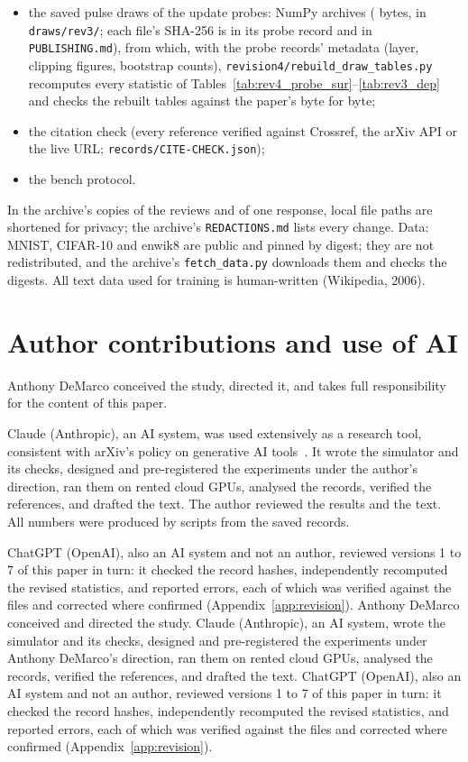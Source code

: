\begin{sloppypar}
\begin{itemize}
      \texttt{revision2/analyze\_rev2.py}, \texttt{revision3/analyze\_rev3.py}, \texttt{revision4/analyze\_rev4.py});
\item the saved pulse draws of the update probes: \RZDrawN{} NumPy archives (\RZDrawBytes{} bytes, in
      \texttt{draws/rev3/}; each file's SHA-256 is in its probe record and in \texttt{PUBLISHING.md}), from which, with the probe records' metadata (layer, clipping figures,
      bootstrap counts), \texttt{revision4/rebuild\_draw\_tables.py} recomputes every statistic of
      Tables~\ref{tab:rev4_probe_sur}--\ref{tab:rev3_dep} and checks the rebuilt tables against the paper's byte for byte;
\item the citation check (every reference verified against Crossref, the arXiv API or the live URL;
      \texttt{records/CITE-CHECK.json});
\item the bench protocol.
\end{itemize}
In the archive's copies of the reviews and of one response, local file paths are shortened for privacy; the archive's
\texttt{REDACTIONS.md} lists every change. Data: MNIST, CIFAR-10 and enwik8 are public and pinned by digest; they are not
redistributed, and the archive's \texttt{fetch\_data.py} downloads them and checks the digests. All text data used for training
is human-written (Wikipedia, 2006).

\end{sloppypar}

\section*{Author contributions and use of AI}
\ifdefined\arxivvariant
Anthony DeMarco conceived the study, directed it, and takes full responsibility for the content of this paper.

Claude (Anthropic), an AI system, was used extensively as a research tool, consistent with arXiv's policy on generative AI
tools~\cite{arxiv_policy}. It wrote the simulator and its checks, designed and pre-registered the experiments under the
author's direction, ran them on rented cloud GPUs, analysed the records, verified the references, and drafted the text. The
author reviewed the results and the text. All numbers were produced by scripts from the saved records.

ChatGPT (OpenAI), also an AI system and not an author, reviewed versions 1 to 7 of this paper in turn: it checked the
record hashes, independently recomputed the revised statistics, and reported errors, each of which was verified against
the files and corrected where confirmed (Appendix~\ref{app:revision}).
\else
Anthony DeMarco conceived and directed the study. Claude (Anthropic), an AI system, wrote the simulator and its checks, designed and
pre-registered the experiments under Anthony DeMarco's direction, ran them on rented cloud GPUs, analysed the records, verified the
references, and drafted the text. ChatGPT (OpenAI), also an AI system and not an author, reviewed versions 1 to 7 of this paper in turn: it checked the
record hashes, independently recomputed the revised statistics, and reported errors, each of which was verified against
the files and corrected where confirmed (Appendix~\ref{app:revision}).


